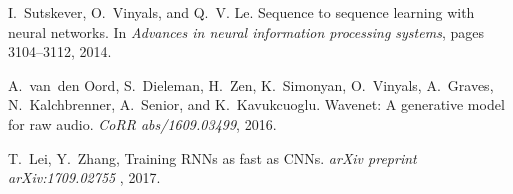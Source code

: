 \documentclass{article}
\begin{document}
\begin{thebibliography}{19}
I.~Sutskever, O.~Vinyals, and Q.~V. Le.
\newblock Sequence to sequence learning with neural networks.
\newblock In \emph{Advances in neural information processing systems}, pages
  3104--3112, 2014.

A.~van~den Oord, S.~Dieleman, H.~Zen, K.~Simonyan, O.~Vinyals, A.~Graves,
  N.~Kalchbrenner, A.~Senior, and K.~Kavukcuoglu.
\newblock Wavenet: A generative model for raw audio.
\newblock \emph{CoRR abs/1609.03499}, 2016.

T.~Lei, Y.~Zhang,
\newblock Training RNNs as fast as CNNs.
\newblock \emph{arXiv preprint arXiv:1709.02755 }, 2017.

\end{thebibliography}
\end{document}
